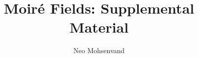 \documentclass[acmtog, anonymous]{acmart}
\theoremstyle{plain}
\theoremstyle{definition}
\begin{document}
\title{Moir\'e Fields: Supplemental Material}
\author{Neo Mohsenvand}
\authorsaddresses{}

\maketitle









\end{document}
